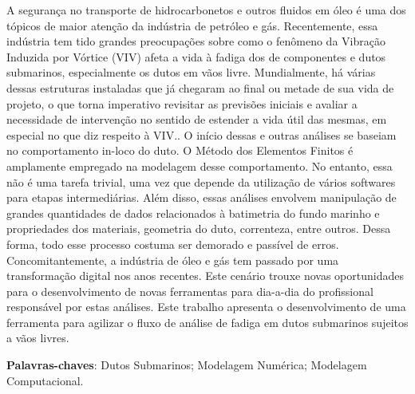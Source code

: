 
\setlength{\absparsep}{18pt} %
\begin{resumo}

    A segurança no transporte de hidrocarbonetos e outros fluidos em óleo é uma dos tópicos de maior atenção da indústria de petróleo e gás.
    Recentemente, essa indústria tem tido grandes preocupações sobre como o fenômeno da Vibração Induzida por Vórtice (VIV) afeta a vida à fadiga dos de componentes e dutos submarinos, especialmente os dutos em vãos livre.
    Mundialmente, há várias dessas estruturas instaladas que já chegaram ao final ou metade de sua vida de projeto, o que torna imperativo revisitar as previsões iniciais e avaliar a necessidade de intervenção no sentido de estender a vida útil das mesmas, em especial no que diz respeito à VIV..
    O início dessas e outras análises se baseiam no comportamento in-loco do duto.
    O Método dos Elementos Finitos é amplamente empregado na modelagem desse comportamento.
    No entanto, essa não é uma tarefa trivial, uma vez que depende da utilização de vários softwares para etapas intermediárias.
    Além disso, essas análises envolvem manipulação de grandes quantidades de dados relacionados à batimetria do fundo marinho e propriedades dos materiais, geometria do duto, correnteza, entre outros.
    Dessa forma, todo esse processo costuma ser demorado e passível de erros.
    Concomitantemente, a indústria de óleo e gás tem passado por uma transformação digital nos anos recentes.
    Este cenário trouxe novas oportunidades para o desenvolvimento de novas ferramentas para dia-a-dia do profissional responsável por estas análises.
    Este trabalho apresenta o desenvolvimento de uma ferramenta para agilizar o fluxo de análise de fadiga em dutos submarinos sujeitos a vãos livres.

    

 \textbf{Palavras-chaves}: Dutos Submarinos; Modelagem Numérica; Modelagem Computacional.
\end{resumo}

